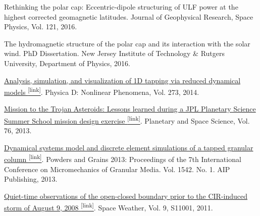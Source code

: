 \begin{itemize*}


  \item \label{itm:sw-2016-eccentric}
    Rethinking the polar cap: Eccentric-dipole structuring of ULF power at the highest corrected geomagnetic latitudes.
    Journal of Geophysical Research, Space Physics, Vol. 121, 2016.

  \item \label{itm:sw-2016-phd} 
    The hydromagnetic structure of the polar cap and its interaction
    with the solar wind.  PhD Dissertation. 
    New Jersey Institute of Technology \& Rutgers University, 
    Department of Physics, 2016.
    

  \item \label{itm:gran-2014-reduced}
    \href{http://www.sciencedirect.com/science/article/pii/S0167278914000189}{
    Analysis, simulation, and visualization of 1D tapping via reduced dynamical models 
    \textsuperscript{\tiny{[link]}}}. 
    Physica D: Nonlinear Phenomena, Vol.  273, 2014.

  \item \label{psss-2013-trojan}
    \href{http://www.sciencedirect.com/science/article/pii/S0032063312003741}{
    Mission to the Trojan Asteroids: Lessons learned during a JPL Planetary Science Summer School mission design exercise 
    \textsuperscript{\tiny{[link]}}}. 
    Planetary and Space Science, Vol. 76, 2013.

  \item \label{itm:gran-2013-simulations}
    \href{http://scitation.aip.org/content/aip/proceeding/aipcp/10.1063/1.4811931}{
    Dynamical systems model and discrete element simulations of a tapped granular column
    \textsuperscript{\tiny{[link]}}}.
    Powders and Grains 2013: Proceedings of the 7th International Conference 
    on Micromechanics of Granular Media. Vol. 1542. No. 1. AIP Publishing, 2013.

  \item \label{sw-2011-quiet-time}
    \href{http://onlinelibrary.wiley.com/doi/10.1029/2011SW000688/full}{
    Quiet-time observations of the open-closed boundary prior to the CIR-induced storm of August 9, 2008 
    \textsuperscript{\tiny{[link]}}}.
    Space Weather, Vol. 9, S11001, 2011.


\end{itemize*}
